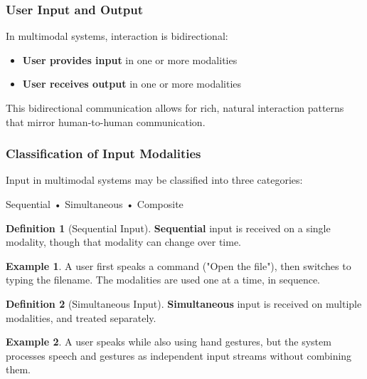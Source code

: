 \documentclass[11pt,a4paper]{article}
\theoremstyle{definition}
\newtheorem{definition}{Definition}[section]
\newtheorem{example}{Example}[section]
\theoremstyle{plain}
\theoremstyle{remark}
\begin{document}
\subsubsection{User Input and Output}

In multimodal systems, interaction is bidirectional:

\begin{itemize}
    \item \textbf{User provides input} in one or more modalities
    \item \textbf{User receives output} in one or more modalities
\end{itemize}

This bidirectional communication allows for rich, natural interaction patterns that mirror human-to-human communication.

\subsubsection{Classification of Input Modalities}

Input in multimodal systems may be classified into three categories:

\begin{tcolorbox}[colback=orange!5!white,colframe=orange!75!black,title=\textbf{Three Types of Input}]
\begin{center}
Sequential • Simultaneous • Composite
\end{center}
\end{tcolorbox}

\begin{definition}[Sequential Input]
\textbf{Sequential} input is received on a single modality, though that modality can change over time.
\end{definition}

\begin{example}
A user first speaks a command ("Open the file"), then switches to typing the filename. The modalities are used one at a time, in sequence.
\end{example}

\begin{definition}[Simultaneous Input]
\textbf{Simultaneous} input is received on multiple modalities, and treated separately.
\end{definition}

\begin{example}
A user speaks while also using hand gestures, but the system processes speech and gestures as independent input streams without combining them.
\end{example}
\end{document}
